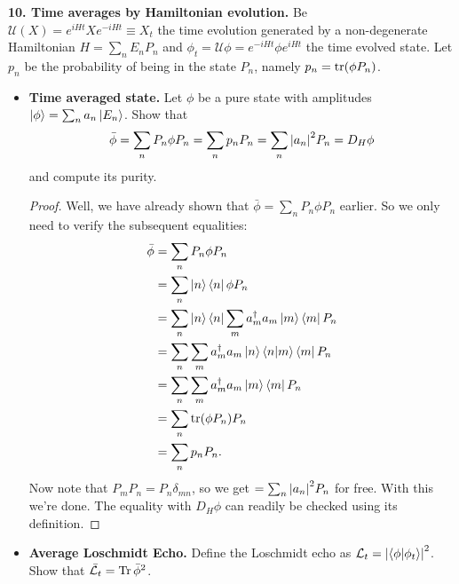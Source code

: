 \documentclass{book}
\theoremstyle{definition}
\newcommand{\lag}{\mathcal{L}}
\newcommand{\nn}{\nonumber}
\begin{document}
\noindent \textbf{10. Time averages by Hamiltonian evolution.} Be $\mathcal{U}(X) = e^{iHt} X e^{-iHt} \equiv X_t$ the time evolution generated by a non-degenerate Hamiltonian $H = \sum_n E_n P_n$ and $\phi_t = \mathcal{U}\phi = e^{-iHt}\phi e^{iHt}$ the time evolved state. Let $p_n$ be the probability of being in the state $P_n$, namely $p_n = \tr(\phi P_n)$. 

\begin{itemize}
	\item \textbf{Time averaged state.} Let $\phi$ be a pure state with amplitudes $\ket{\phi} = \sum_n a_n \ket{E_n}$. Show that
	\begin{align}
	\bar{\phi} = \sum_n P_n \phi P_n = \sum_n p_n P_n = \sum_n \abs{a_n}^2 P_n = D_H \phi
	\end{align}
	and compute its purity. 
	
	\begin{proof}
		 Well, we have already shown that $\bar{\phi} = \sum_n P_n \phi P_n$ earlier. So we only need to verify the subsequent equalities:
		 \begin{align}
		 \bar\phi &= \sum_n P_n \phi P_n \nn\\
		 &= \sum_n \ket{n}\bra{n}\phi P_n\nn\\
		 &= \sum_n \ket{n} \bra{n}\sum_m a_m^\dagger a_m \ket{m}\bra{m} P_n\nn\\
		 &=  \sum_n  \sum_m a_m^\dagger a_m \ket{n} \braket{n}{m}\bra{m} P_n\nn\\
		 &= \sum_n  \sum_m a_m^\dagger a_m \ket{m} \bra{m} P_n\nn\\
		 &= \sum_n \tr(\phi P_n)P_n\nn\\
		 &= \sum_n p_n P_n.
		 \end{align}
		 Now note that $P_m P_n = P_n \delta_{mn}$, so we get $=\sum_n \abs{a_n}^2P_n$ for free. With this we're done. The equality with $D_H \phi$ can readily be checked using its definition. 
	\end{proof}
	
	
	
	\item \textbf{Average Loschmidt Echo.} Define the Loschmidt echo as $\lag_t = \abs{\braket{\phi}{\phi_t}}^2$. Show that $\bar{\lag_t} = \Tr \bar{\phi}^2$.
	

\end{itemize}
\end{document}
